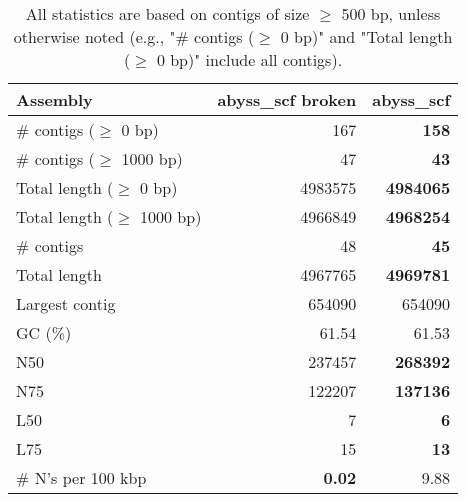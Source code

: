 \documentclass[12pt,a4paper]{article}
\begin{document}
\begin{table}[ht]
\begin{center}
\caption{All statistics are based on contigs of size $\geq$ 500 bp, unless otherwise noted (e.g., "\# contigs ($\geq$ 0 bp)" and "Total length ($\geq$ 0 bp)" include all contigs).}
\begin{tabular}{|l*{2}{|r}|}
\hline
Assembly & abyss\_scf broken & abyss\_scf \\ \hline
\# contigs ($\geq$ 0 bp) & 167 & {\bf 158} \\ \hline
\# contigs ($\geq$ 1000 bp) & 47 & {\bf 43} \\ \hline
Total length ($\geq$ 0 bp) & 4983575 & {\bf 4984065} \\ \hline
Total length ($\geq$ 1000 bp) & 4966849 & {\bf 4968254} \\ \hline
\# contigs & 48 & {\bf 45} \\ \hline
Total length & 4967765 & {\bf 4969781} \\ \hline
Largest contig & 654090 & 654090 \\ \hline
GC (\%) & 61.54 & 61.53 \\ \hline
N50 & 237457 & {\bf 268392} \\ \hline
N75 & 122207 & {\bf 137136} \\ \hline
L50 & 7 & {\bf 6} \\ \hline
L75 & 15 & {\bf 13} \\ \hline
\# N's per 100 kbp & {\bf 0.02} & 9.88 \\ \hline
\end{tabular}
\end{center}
\end{table}
\end{document}
